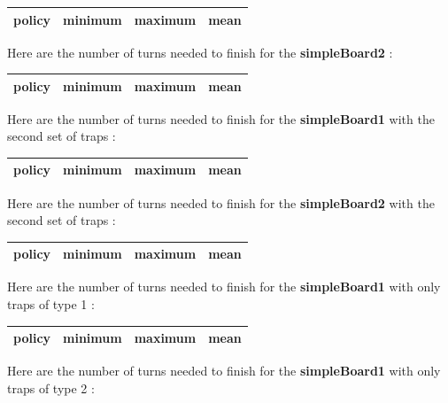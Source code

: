 \documentclass{eplDoc}
\begin{document}
\begin{center}
		\begin{tabular}{|r|ccc|}
			\hline
			policy & minimum & maximum & mean \\ 
			\hline
            
   		\hline
		\end{tabular}
\end{center}


Here are the number of turns needed to finish for the \textbf{simpleBoard2} : 


\begin{center}
		\begin{tabular}{|r|ccc|}
			\hline
			policy & minimum & maximum & mean \\ 
			\hline
            
   		\hline
		\end{tabular}
\end{center}

Here are the number of turns needed to finish for the \textbf{simpleBoard1} with the second set of traps : 

\begin{center}
		\begin{tabular}{|r|ccc|}
			\hline
			policy & minimum & maximum & mean \\ 
			\hline
            
   		\hline
		\end{tabular}
\end{center}

Here are the number of turns needed to finish for the \textbf{simpleBoard2} with the second set of traps : 

\begin{center}
		\begin{tabular}{|r|ccc|}
			\hline
			policy & minimum & maximum & mean \\ 
			\hline
            
   		\hline
		\end{tabular}
\end{center}

Here are the number of turns needed to finish for the \textbf{simpleBoard1} with only traps of type 1 : 

\begin{center}
		\begin{tabular}{|r|ccc|}
			\hline
			policy & minimum & maximum & mean \\ 
			\hline
            
   		\hline
		\end{tabular}
\end{center}
Here are the number of turns needed to finish for the \textbf{simpleBoard1} with only traps of type 2 : 
\end{document}
